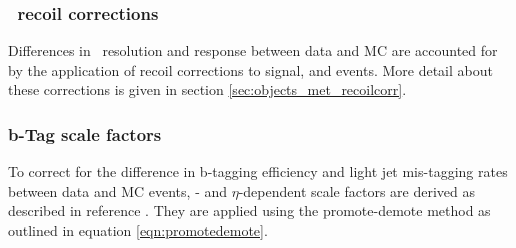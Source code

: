 \subsubsection*{\MET~recoil corrections}
Differences in \MET~resolution and response between data and \ac{MC} 
are accounted for by the application of recoil corrections
to signal, \Wjets and \Ztautau events. More detail
about these corrections is given in section \ref{sec:objects_met_recoilcorr}.
\subsubsection*{b-Tag scale factors}
To correct for the difference in b-tagging efficiency
and light jet mis-tagging rates between data and \ac{MC} events,
\pT- and $\eta$-dependent scale factors are derived as 
described in reference \cite{cms-btag-run2}. They 
are applied using the promote-demote method
as outlined in equation \ref{eqn:promotedemote}.
